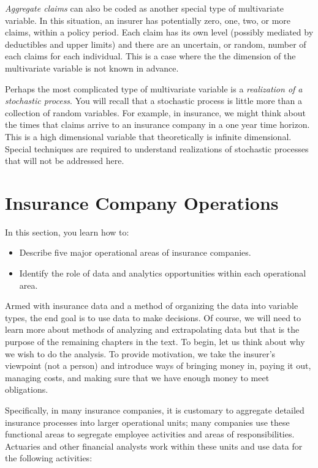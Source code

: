 \documentclass[]{book}
\providecommand{\tightlist}{%
  \setlength{\itemsep}{0pt}\setlength{\parskip}{0pt}}
\begin{document}
\emph{Aggregate claims} can also be coded as another special type of
multivariate variable. In this situation, an insurer has potentially
zero, one, two, or more claims, within a policy period. Each claim has
its own level (possibly mediated by deductibles and upper limits) and
there are an uncertain, or random, number of each claims for each
individual. This is a case where the the dimension of the multivariate
variable is not known in advance.

Perhaps the most complicated type of multivariate variable is a
\emph{realization of a stochastic process}. You will recall that a
stochastic process is little more than a collection of random variables.
For example, in insurance, we might think about the times that claims
arrive to an insurance company in a one year time horizon. This is a
high dimensional variable that theoretically is infinite dimensional.
Special techniques are required to understand realizations of stochastic
processes that will not be addressed here.

\section{Insurance Company Operations}\label{S:PredModApps}

In this section, you learn how to:

\begin{itemize}
\tightlist
\item
  Describe five major operational areas of insurance companies.
\item
  Identify the role of data and analytics opportunities within each
  operational area.
\end{itemize}

Armed with insurance data and a method of organizing the data into
variable types, the end goal is to use data to make decisions. Of
course, we will need to learn more about methods of analyzing and
extrapolating data but that is the purpose of the remaining chapters in
the text. To begin, let us think about why we wish to do the analysis.
To provide motivation, we take the insurer's viewpoint (not a person)
and introduce ways of bringing money in, paying it out, managing costs,
and making sure that we have enough money to meet obligations.

Specifically, in many insurance companies, it is customary to aggregate
detailed insurance processes into larger operational units; many
companies use these functional areas to segregate employee activities
and areas of responsibilities. Actuaries and other financial analysts
work within these units and use data for the following activities:
\end{document}

